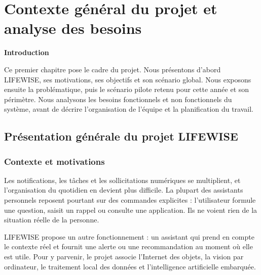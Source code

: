 \chapter{\textcolor{mycolor}{\textbf{Contexte général du projet et analyse des besoins}}}
\fancyhf{}
\fancyhead[L]{\small\itshape\nouppercase{\rightmark}}
\fancyfoot[L]{\small\itshape\nouppercase{\leftmark}}
\fancyfoot[R]{\small\itshape\thepage}
\renewcommand{\headrulewidth}{1pt}
\renewcommand{\footrulewidth}{0.4pt}

\vfill
\begin{flushright}{\Large\bfseries\textcolor{mycolor}{Introduction}}\end{flushright}

Ce premier chapitre pose le cadre du projet. Nous présentons d'abord LIFEWISE, ses motivations, ses objectifs et
son scénario global. Nous exposons ensuite la problématique, puis le scénario pilote retenu pour cette année et son
périmètre. Nous analysons les besoins fonctionnels et non fonctionnels du système, avant de décrire l'organisation
de l'équipe et la planification du travail.

\clearpage

\section{Présentation générale du projet LIFEWISE}

\subsection{Contexte et motivations}

Les notifications, les tâches et les sollicitations numériques se multiplient, et l'organisation du quotidien en
devient plus difficile. La plupart des assistants personnels reposent pourtant sur des commandes explicites :
l'utilisateur formule une question, saisit un rappel ou consulte une application. Ils ne voient rien de la
situation réelle de la personne.

LIFEWISE propose un autre fonctionnement : un assistant qui prend en compte le contexte réel et fournit une alerte
ou une recommandation au moment où elle est utile. Pour y parvenir, le projet associe l'Internet des objets, la
vision par ordinateur, le traitement local des données et l'intelligence artificielle embarquée.

